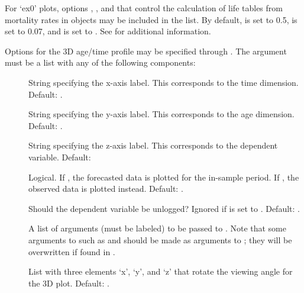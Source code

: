 \begin{Details}
For `ex0' plots, options , , and  that control the calculation of life tables from mortality rates in  objects may be included in the  list. By default,  is set to 0.5,  is set to 0.07, and  is set to . See  for additional information.


Options for the 3D age/time profile may be specified through . The argument must be a list with any of the following components:
\begin{description}

\item[] String specifying the x-axis label. This corresponds to the time dimension. Default: .

\item[] String specifying the y-axis label. This corresponds to the age dimension. Default: .

\item[] String specifying the z-axis label. This corresponds to the dependent variable. Default: 

\item[] Logical. If , the forecasted data is plotted for the in-sample period. If , the observed data is plotted instead. Default: .

\item[] Should the dependent variable be unlogged? Ignored if  is set to . Default: .

\item[] A list of arguments (must be labeled) to be
passed to . Note that some arguments to 
such as  and  should be made as arguments to
; they will be overwritten if found in
.

\item[] List with three elements `x', `y',
and `z' that rotate the viewing angle for the 3D plot. Default: .

\end{description}
 




\end{Details}
